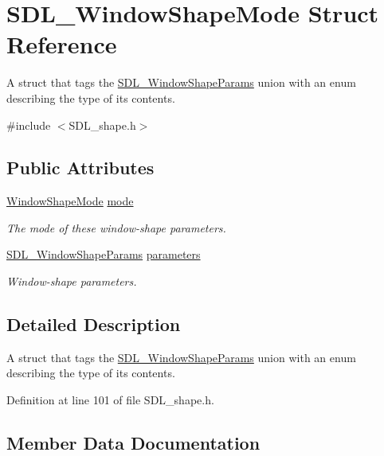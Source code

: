 \hypertarget{struct_s_d_l___window_shape_mode}{}\section{S\+D\+L\+\_\+\+Window\+Shape\+Mode Struct Reference}
\label{struct_s_d_l___window_shape_mode}


A struct that tags the \mbox{\hyperlink{union_s_d_l___window_shape_params}{S\+D\+L\+\_\+\+Window\+Shape\+Params}} union with an enum describing the type of its contents.  




{\ttfamily \#include $<$S\+D\+L\+\_\+shape.\+h$>$}

\subsection*{Public Attributes}
\begin{DoxyCompactItemize}
\item 
\mbox{\hyperlink{_s_d_l__shape_8h_aa30948f2699e316a43b740eccebe5c20}{Window\+Shape\+Mode}} \mbox{\hyperlink{struct_s_d_l___window_shape_mode_a40ebd8b9a76d982cbd87563386cc05de}{mode}}
\begin{DoxyCompactList}\small\item\em The mode of these window-\/shape parameters. \end{DoxyCompactList}\item 
\mbox{\hyperlink{union_s_d_l___window_shape_params}{S\+D\+L\+\_\+\+Window\+Shape\+Params}} \mbox{\hyperlink{struct_s_d_l___window_shape_mode_a2f79bb294034156207fa6d88d3a8c819}{parameters}}
\begin{DoxyCompactList}\small\item\em Window-\/shape parameters. \end{DoxyCompactList}\end{DoxyCompactItemize}


\subsection{Detailed Description}
A struct that tags the \mbox{\hyperlink{union_s_d_l___window_shape_params}{S\+D\+L\+\_\+\+Window\+Shape\+Params}} union with an enum describing the type of its contents. 

Definition at line 101 of file S\+D\+L\+\_\+shape.\+h.



\subsection{Member Data Documentation}
\mbox{\label{struct_s_d_l___window_shape_mode_a40ebd8b9a76d982cbd87563386cc05de}} 
